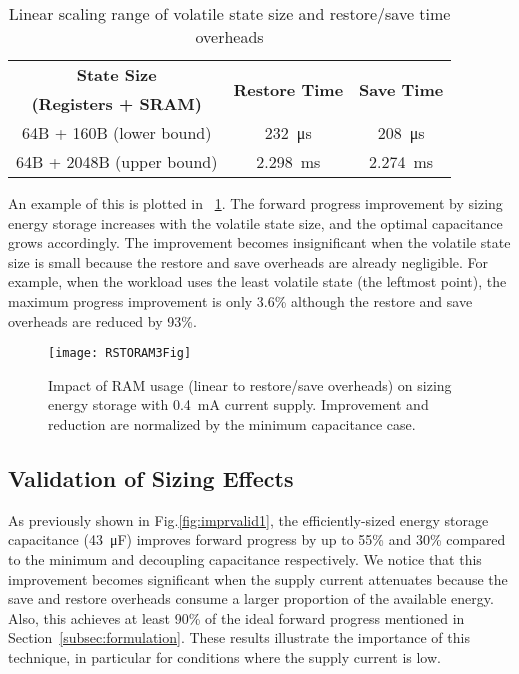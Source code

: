 
\begin{table}[!t]
    \renewcommand{\arraystretch}{1.2}
    \centering
    \caption{Linear scaling range of volatile state size and restore/save time overheads}
    \label{tab:ramscale}
    \begin{tabular}{|c|cc|}
    \hline
    \textbf{State Size} & \multirow{2}{*}{\textbf{Restore Time}} & \multirow{2}{*}{\textbf{Save Time}}\\
    \textbf{(Registers + SRAM)} & & \\
    \hline
    64B + 160B (lower bound) & \SI{232}{\micro\second} & \SI{208}{\micro\second}\\
    64B + 2048B (upper bound) & \SI{2.298}{\milli\second} & \SI{2.274}{\milli\second} \\
    \hline
    \end{tabular}
\end{table}

An example of this is plotted in \figurename{~\ref{fig:ram}}. The forward progress improvement by sizing energy storage increases with the volatile state size, and the optimal capacitance grows accordingly. The improvement becomes insignificant when the volatile state size is small because the restore and save overheads are already negligible. For example, when the workload uses the least volatile state (the leftmost point), the maximum progress improvement is only 3.6\% although the restore and save overheads are reduced by 93\%. 

\begin{figure}[!t]
    \centering
    \texttt{[image: RSTORAM3Fig]}
    \caption{Impact of RAM usage (linear to restore/save overheads) on sizing energy storage with \SI{0.4}{\milli\ampere} current supply. Improvement and reduction are normalized by the minimum capacitance case. }
    \label{fig:ram}
\end{figure}

\subsection{Validation of Sizing Effects}

As previously shown in Fig.\ref{fig:imprvalid1}, the efficiently-sized energy storage capacitance (\SI{43}{\micro\farad}) improves forward progress by up to 55\% and 30\% compared to the minimum and decoupling capacitance respectively. We notice that this improvement becomes significant when the supply current attenuates because the save and restore overheads consume a larger proportion of the available energy. Also, this achieves at least 90\% of the ideal forward progress mentioned in Section~\ref{subsec:formulation}. 
These results illustrate the importance of this technique, in particular for conditions where the supply current is low.